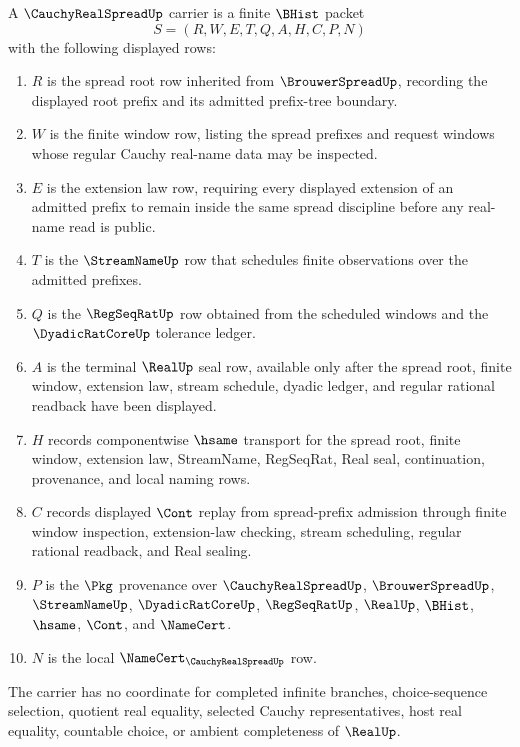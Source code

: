 \begin{definition}
\label{def:cauchy-real-spread-carrier}
A $\CauchyRealSpreadUp$ carrier is a finite $\BHist$ packet
$$
S=(R,W,E,T,Q,A,H,C,P,N)
$$
with the following displayed rows:
\begin{enumerate}
\item $R$ is the spread root row inherited from $\BrouwerSpreadUp$, recording the displayed root prefix and its admitted prefix-tree boundary.
\item $W$ is the finite window row, listing the spread prefixes and request windows whose regular Cauchy real-name data may be inspected.
\item $E$ is the extension law row, requiring every displayed extension of an admitted prefix to remain inside the same spread discipline before any real-name read is public.
\item $T$ is the $\StreamNameUp$ row that schedules finite observations over the admitted prefixes.
\item $Q$ is the $\RegSeqRatUp$ row obtained from the scheduled windows and the $\DyadicRatCoreUp$ tolerance ledger.
\item $A$ is the terminal $\RealUp$ seal row, available only after the spread root, finite window, extension law, stream schedule, dyadic ledger, and regular rational readback have been displayed.
\item $H$ records componentwise $\hsame$ transport for the spread root, finite window, extension law, StreamName, RegSeqRat, Real seal, continuation, provenance, and local naming rows.
\item $C$ records displayed $\Cont$ replay from spread-prefix admission through finite window inspection, extension-law checking, stream scheduling, regular rational readback, and Real sealing.
\item $P$ is the $\Pkg$ provenance over $\CauchyRealSpreadUp$, $\BrouwerSpreadUp$, $\StreamNameUp$, $\DyadicRatCoreUp$, $\RegSeqRatUp$, $\RealUp$, $\BHist$, $\hsame$, $\Cont$, and $\NameCert$.
\item $N$ is the local $\NameCert_{\CauchyRealSpreadUp}$ row.
\end{enumerate}
The carrier has no coordinate for completed infinite branches, choice-sequence selection, quotient real equality, selected Cauchy representatives, host real equality, countable choice, or ambient completeness of $\RealUp$.
\end{definition}

